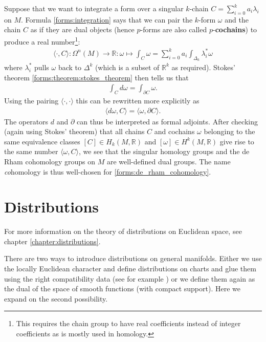     Suppose that we want to integrate a form over a singular $k$-chain $C = \sum_{i=0}^ka_i\lambda_i$ on $M$. Formula \ref{forms:integration} says that we can pair the $k$-form $\omega$ and the chain $C$ as if they are dual objects (hence $p$-forms are also called $p$-\textbf{cochains}) to produce a real number\footnote{This requires the chain group to have real coefficients instead of integer coefficients as is mostly used in homology.}:
    \begin{gather}
        \langle\cdot,C\rangle:\Omega^n(M)\rightarrow\mathbb{R}:\omega\mapsto\int_C\omega = \sum_{i=0}^ka_i\int_{\Delta_k}\lambda_i^{*}\omega
    \end{gather}
    where $\lambda_i^*$ pulls $\omega$ back to $\Delta^k$ (which is a subset of $\mathbb{R}^k$ as required). Stokes' theorem \ref{forms:theorem:stokes_theorem} then tells us that
    \begin{gather}
        \int_Cd\omega = \int_{\partial C}\omega.
    \end{gather}
    Using the pairing $\langle\cdot,\cdot\rangle$ this can be rewritten more explicitly as
    \begin{gather}
        \langle d\omega, C\rangle = \langle \omega, \partial C\rangle.
    \end{gather}
    The operators $d$ and $\partial$ can thus be interpreted as formal adjoints. After checking (again using Stokes' theorem) that all chains $C$ and cochains $\omega$ belonging to the same equivalence classes $[C]\in H_k(M, \mathbb{R})$ and $[\omega]\in H^k(M, \mathbb{R})$ give rise to the same number $\langle\omega, C\rangle$, we see that the singular homology groups and the de Rham cohomology groups on $M$ are well-defined dual groups. The name \textit{co}homology is thus well-chosen for \ref{forms:de_rham_cohomology}.

\section{Distributions}

    For more information on the theory of distributions on Euclidean space, see chapter \ref{chapter:distributions}.

    There are two ways to introduce distributions on general manifolds. Either we use the locally Euclidean character and define distributions on charts and glue them using the right compatibility data (see for example \cite{AMP1}) or we define them again as the dual of the space of smooth functions (with compact support). Here we expand on the second possibility.

